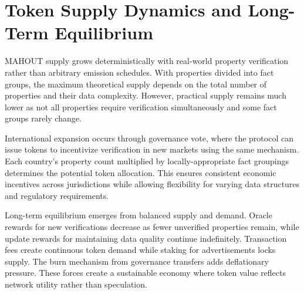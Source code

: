 \section{Token Supply Dynamics and Long-Term Equilibrium}

MAHOUT supply grows deterministically with real-world property verification rather than arbitrary emission schedules. With properties divided into fact groups, the maximum theoretical supply depends on the total number of properties and their data complexity. However, practical supply remains much lower as not all properties require verification simultaneously and some fact groups rarely change.

International expansion occurs through governance vote, where the protocol can issue tokens to incentivize verification in new markets using the same mechanism. Each country's property count multiplied by locally-appropriate fact groupings determines the potential token allocation. This ensures consistent economic incentives across jurisdictions while allowing flexibility for varying data structures and regulatory requirements.

Long-term equilibrium emerges from balanced supply and demand. Oracle rewards for new verifications decrease as fewer unverified properties remain, while update rewards for maintaining data quality continue indefinitely. Transaction fees create continuous token demand while staking for advertisements locks supply. The burn mechanism from governance transfers adds deflationary pressure. These forces create a sustainable economy where token value reflects network utility rather than speculation.